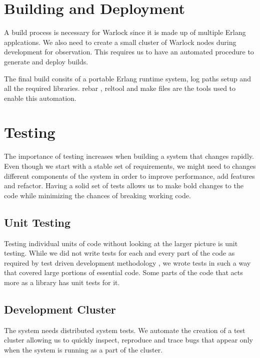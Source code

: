 \section{Building and Deployment}

A build%
process is necessary for Warlock since it is made up of multiple Erlang
applcations. We also need to create a small cluster of Warlock nodes during
development for observation. This requires us to have an automated procedure
to generate and deploy builds.

The final build consits of a portable Erlang runtime system, log
paths setup and all the required libraries. rebar \citep{rebar}, reltool
\citep{reltool} and make files \citep{makefiles} are the tools used to enable
this automation.

\section{Testing}

The importance of testing increases when building a system that changes
rapidly. Even though we start with a stable set of requirements, we might
need to changes different components of the system in order to improve
performance, add features and refactor. Having a solid set of tests allows
us to make bold changes to the code while minimizing the chances of breaking
working code.

\subsection{Unit Testing}

Testing individual units of code without looking at the larger picture is unit
testing. While we did not write tests for each and every part of the code as
required by test driven development methodology \citep{Beck:2002:TDD:579193},
we wrote tests in such a way that covered large portions of essential code.
Some parts of the code that acts more as a library has unit tests for it.

\subsection{Development Cluster}

The system needs distributed system tests. We automate the creation of a test
cluster allowing us to quickly inspect, reproduce and trace bugs that appear
only when the system is running as a part of the cluster.

